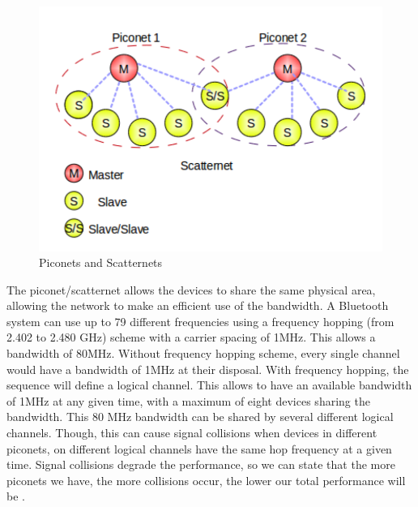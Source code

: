 \documentclass[a4paper, 11pt]{report}
\begin{document}
	\begin{figure}[h]
		\centering	
		\includegraphics[scale=0.60]{images/scatternet.pdf} 
		\caption{Piconets and Scatternets}\label{fig:scatternet}
	\end{figure}

The piconet/scatternet allows the devices to share the same physical area, allowing the network to make an efficient use of the bandwidth. A Bluetooth system can use up to 79 different frequencies using a frequency hopping (from 2.402 to 2.480 GHz) \cite{bluetoothStack} scheme with a carrier spacing of 1MHz. This allows a bandwidth of 80MHz. Without frequency hopping scheme, every single channel would have a bandwidth of 1MHz at their disposal. With frequency hopping, the sequence will define a logical channel. This allows to have an available bandwidth of 1MHz at any given time, with a maximum of eight devices sharing the bandwidth. This 80 MHz bandwidth can be shared by several different logical channels. Though, this can cause signal collisions when devices in different piconets, on different logical channels have the same hop frequency at a given time. Signal collisions degrade the performance, so we can state that the more piconets we have, the more collisions occur, the lower our total performance will be \cite{introBluetooth}.
\end{document}
